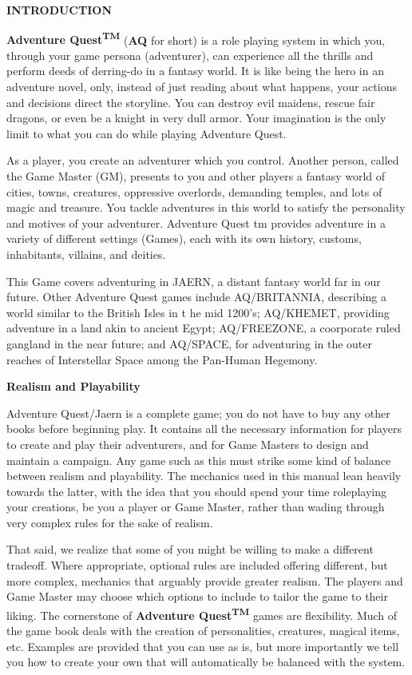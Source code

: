 \textbf{INTRODUCTION}

\textbf{Adventure Quest\textsuperscript{TM}} (\textbf{AQ} for short) is a role playing system in which you, through your game persona (adventurer), can experience all the thrills and perform deeds of derring-do in a fantasy world. It is like being the hero in an adventure novel, only, instead of just reading about what happens, your actions and decisions direct the storyline. You can destroy evil maidens, rescue fair dragons, or even be a knight in very dull armor. Your imagination is the only limit to what you can do while playing Adventure Quest.

As a player, you create an adventurer which you control. Another person, called the Game Master (GM), presents to you and other players a fantasy world of cities, towns, creatures, oppressive overlords, demanding temples, and lots of magic and treasure. You tackle adventures in this world to satisfy the personality and motives of your adventurer. Adventure Quest tm provides adventure in a variety of different settings (Games), each with its own history, customs, inhabitants, villains, and deities. 

This Game covers adventuring in JAERN, a distant fantasy world far in our future. Other Adventure Quest games include AQ/BRITANNIA, describing a world similar to the British Isles in t he mid 1200’s; AQ/KHEMET, providing adventure in a land akin to ancient Egypt; AQ/FREEZONE, a coorporate ruled gangland in the near future; and AQ/SPACE, for adventuring in the outer reaches of Interstellar Space among the Pan-Human Hegemony.

\textbf{Realism and Playability}

Adventure Quest/Jaern is a complete game; you do not have to buy any other books before beginning play. It contains all the necessary information for players to create and play their adventurers, and for Game Masters to design and maintain a campaign. Any game such as this must strike some kind of balance between realism and playability. The mechanics used in this manual lean heavily towards the latter, with the idea that you should spend your time roleplaying your creations, be you a player or Game Master, rather than wading through very complex rules for the sake of realism.

That said, we realize that some of you might be willing to make a different tradeoff. Where appropriate, optional rules are included offering different, but more complex, mechanics that arguably provide greater realism. The players and Game Master may choose which options to include to tailor the game to their liking. The cornerstone of \textbf{Adventure Quest\textsuperscript{TM}} games are flexibility. Much of the game book deals with the creation of personalities, creatures, magical items, etc. Examples are provided that you can use as is, but more importantly we tell you how to create your own that will automatically be balanced with the system.

